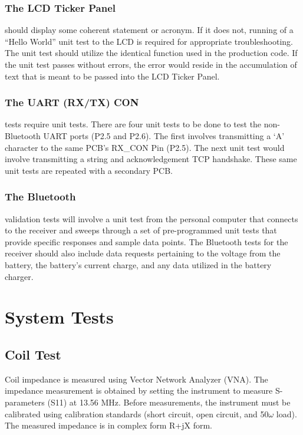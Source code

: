 \documentclass[12pt]{article}
\begin{document}
\subsubsection*{The LCD Ticker Panel} should display some coherent statement or acronym.  If it does not, running of a “Hello World” unit test to the LCD is required for appropriate troubleshooting.  The unit test should utilize the identical function used in the production code.  If the unit test passes without errors, the error would reside in the accumulation of text that is meant to be passed into the LCD Ticker Panel.

\subsubsection*{The UART (RX/TX) CON} tests require unit tests. There are four unit tests to be done to test the non-Bluetooth UART ports (P2.5 and P2.6).  The first involves transmitting a ‘A’ character to the same PCB’s RX\_CON Pin (P2.5).  The next unit test would involve transmitting a string and acknowledgement TCP handshake.  These same unit tests are repeated with a secondary PCB.

\subsubsection*{The Bluetooth} validation tests will involve a unit test from the personal computer that connects to the receiver and sweeps through a set of pre-programmed unit tests that provide specific responses and sample data points.  The Bluetooth tests for the receiver should also include data requests pertaining to the voltage from the battery, the battery's current charge, and any data utilized in the battery charger.
\hfill \\
\pagebreak
\hfill
\section*{System Tests}
\subsection{Coil Test}
Coil impedance is measured using Vector Network Analyzer (VNA). The impedance measurement is obtained by setting the instrument to measure S-parameters (S11) at 13.56 MHz.  Before measurements, the instrument must be calibrated using calibration standards (short circuit, open circuit, and 50$\omega$ load).  The measured impedance is in complex form R+jX form.\\
\end{document}
